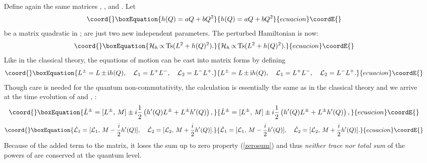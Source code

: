 \documentclass[a4paper,12pt]{article}
\begin{document}
Define again the same matrices \coordHE{}, \coordHE{}, \coordHE{} and \coordHE{}. Let
\begin{equation}\coord{}\boxEquation{
h(Q)=aQ+bQ^{2}
}{
h(Q)=aQ+bQ^{2}
}{ecuacion}\coordE{}\end{equation}
be a matrix quadratic in \coordHE{}; \coordHE{} are just two new independent
parameters.
The perturbed Hamiltonian is now:
\begin{equation}\coord{}\boxEquation{
    {\cal H}_{h}\thinspace {\propto}
\thinspace \mbox{Ts}(L^{2}+h(Q)^{2}).
    \label{quartham}
}{
    {\cal H}_{h}\thinspace {\propto}
\thinspace \mbox{Ts}(L^{2}+h(Q)^{2}).
    }{ecuacion}\coordE{}\end{equation}
Like in the classical theory, the equations of motion can be cast into
matrix forms by defining
\begin{equation}\coord{}\boxEquation{
 L^{\pm}=L\, {\pm} \, {\rm i} h(Q),\quad
 {\cal L}_1=L^{+}L^{-},\quad {\cal L}_2=L^{-}L^{+}.
}{
 L^{\pm}=L\, {\pm} \, {\rm i} h(Q),\quad
 {\cal L}_1=L^{+}L^{-},\quad {\cal L}_2=L^{-}L^{+}.
}{ecuacion}\coordE{}\end{equation}
Though care is needed for the quantum non-commutativity, the calculation is
essentially the same as in the classical theory and we arrive at
the time evolution of \coordHE{} and \coordHE{},  \coordHE{}:
\begin{equation}\coord{}\boxEquation{
\dot{L}^{\pm}=[L^{\pm},\, M] \pm
i{1\over2}\left(h'(Q)L^{\pm}+L^{\pm}h'(Q)\right),
}{
\dot{L}^{\pm}=[L^{\pm},\, M] \pm
i{1\over2}\left(h'(Q)L^{\pm}+L^{\pm}h'(Q)\right),
}{ecuacion}\coordE{}\end{equation}
\begin{equation}\coord{}\boxEquation{
\dot{\cal L}_1=[{\cal L}_1,\, M-{i\over2}h'(Q)],\quad
\dot{\cal L}_2=[{\cal L}_2,\, M+{i\over2}h'(Q)].
}{
\dot{\cal L}_1=[{\cal L}_1,\, M-{i\over2}h'(Q)],\quad
\dot{\cal L}_2=[{\cal L}_2,\, M+{i\over2}h'(Q)].
}{ecuacion}\coordE{}\end{equation}
Because of the added term \coordHE{} to the \coordHE{} matrix,
it loses the sum up to zero property (\ref{zerosum}) and thus {\em neither
trace nor total sum} of the powers of \coordHE{} are conserved
at the quantum level.

\end{document}
